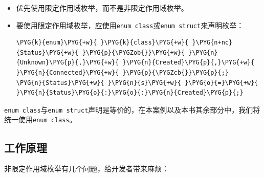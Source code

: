 
\begin{itemize}
\item 优先使用限定作用域枚举，而不是非限定作用域枚举。



\item 要使用限定作用域枚举，应使用\texttt{enum class}或\texttt{enum struct}来声明枚举：



\begin{codeblockbg}
\begin{Verbatim}[commandchars=\\\{\},breaklines=true,breakanywhere=true,fontsize=\codefont,xleftmargin=17bp]
\PYG{k}{enum}\PYG{+w}{ }\PYG{k}{class}\PYG{+w}{ }\PYG{n+nc}{Status}\PYG{+w}{ }\PYG{p}{\PYGZob{}}\PYG{+w}{ }\PYG{n}{Unknown}\PYG{p}{,}\PYG{+w}{ }\PYG{n}{Created}\PYG{p}{,}\PYG{+w}{ }\PYG{n}{Connected}\PYG{+w}{ }\PYG{p}{\PYGZcb{}}\PYG{p}{;}
\PYG{n}{Status}\PYG{+w}{ }\PYG{n}{s}\PYG{+w}{ }\PYG{o}{=}\PYG{+w}{ }\PYG{n}{Status}\PYG{o}{:}\PYG{o}{:}\PYG{n}{Created}\PYG{p}{;}
\end{Verbatim}
\end{codeblockbg}

\end{itemize}



\begin{myNote}
\texttt{enum class}与\texttt{enum struct}声明是等价的，在本案例以及本书其余部分中，我们将统一使用\texttt{enum class}。
\end{myNote}



\subsection{工作原理}



非限定作用域枚举有几个问题，给开发者带来麻烦：



